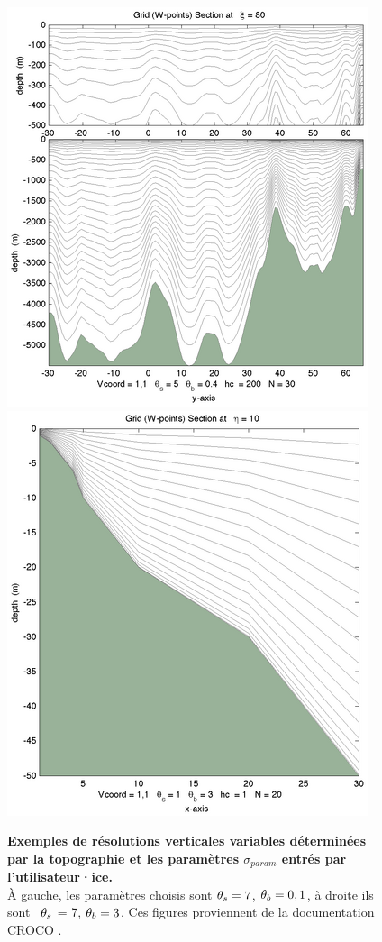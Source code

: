 \documentclass[10pt,a4paper,titlepage]{article}
\begin{document}
\begin{figure}[h!]
    \centering
    \includegraphics[scale=0.7]{../images/vcoord_ex1.png}
    \hspace{2cm}
    \includegraphics[scale=0.7]{../images/vcoord_ex5.png}
    \caption{\textbf{Exemples de résolutions verticales variables déterminées par la topographie et les paramètres  $\sigma_{param}$ entrés par l'utilisateur·ice.} \\
        À gauche, les paramètres choisis sont  $\protect\theta_s = 7$, $\protect\theta_b = 0,1$, à droite ils sont  $\protect\theta_s$ = 7, $\protect\theta_b = 3$.
        Ces figures proviennent de la documentation CROCO \parencite{grid_doc}.}
    \label{fig:vertical_resolution}
\end{figure}
\end{document}

